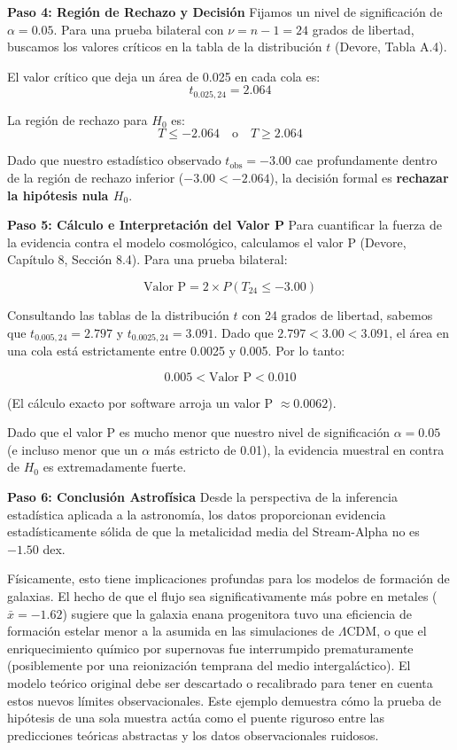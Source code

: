 \textbf{Paso 4: Región de Rechazo y Decisión}
Fijamos un nivel de significación de $\alpha = 0.05$. Para una prueba bilateral con $\nu = n - 1 = 24$ grados de libertad, buscamos los valores críticos en la tabla de la distribución $t$ (Devore, Tabla A.4). 

El valor crítico que deja un área de 0.025 en cada cola es:
$$ t_{0.025, 24} = 2.064 $$

La región de rechazo para $H_0$ es:
$$ T \le -2.064 \quad \text{o} \quad T \ge 2.064 $$

Dado que nuestro estadístico observado $t_{\text{obs}} = -3.00$ cae profundamente dentro de la región de rechazo inferior ($-3.00 < -2.064$), la decisión formal es \textbf{rechazar la hipótesis nula $H_0$}.

\textbf{Paso 5: Cálculo e Interpretación del Valor P}
Para cuantificar la fuerza de la evidencia contra el modelo cosmológico, calculamos el valor P (Devore, Capítulo 8, Sección 8.4). Para una prueba bilateral:

$$ \text{Valor P} = 2 \times P(T_{24} \le -3.00) $$

Consultando las tablas de la distribución $t$ con 24 grados de libertad, sabemos que $t_{0.005, 24} = 2.797$ y $t_{0.0025, 24} = 3.091$. Dado que $2.797 < 3.00 < 3.091$, el área en una cola está estrictamente entre 0.0025 y 0.005. Por lo tanto:

$$ 0.005 < \text{Valor P} < 0.010 $$

(El cálculo exacto por software arroja un valor P $\approx 0.0062$). 

Dado que el valor P es mucho menor que nuestro nivel de significación $\alpha = 0.05$ (e incluso menor que un $\alpha$ más estricto de 0.01), la evidencia muestral en contra de $H_0$ es extremadamente fuerte.

\textbf{Paso 6: Conclusión Astrofísica}
Desde la perspectiva de la inferencia estadística aplicada a la astronomía, los datos proporcionan evidencia estadísticamente sólida de que la metalicidad media del Stream-Alpha no es $-1.50$ dex. 

Físicamente, esto tiene implicaciones profundas para los modelos de formación de galaxias. El hecho de que el flujo sea significativamente más pobre en metales ($\bar{x} = -1.62$) sugiere que la galaxia enana progenitora tuvo una eficiencia de formación estelar menor a la asumida en las simulaciones de $\Lambda$CDM, o que el enriquecimiento químico por supernovas fue interrumpido prematuramente (posiblemente por una reionización temprana del medio intergaláctico). El modelo teórico original debe ser descartado o recalibrado para tener en cuenta estos nuevos límites observacionales. Este ejemplo demuestra cómo la prueba de hipótesis de una sola muestra actúa como el puente riguroso entre las predicciones teóricas abstractas y los datos observacionales ruidosos.
